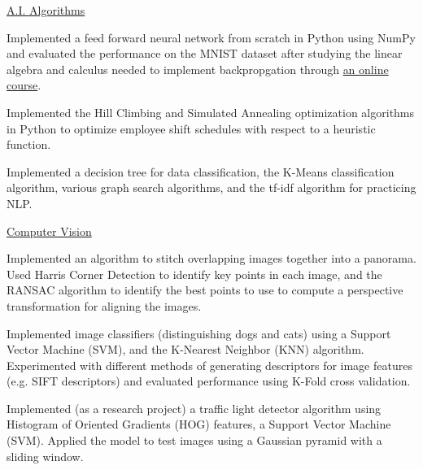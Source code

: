 
\begin{cventries}
  \cventry
    {} %
    {\href{https://github.com/dangbert/AI}{A.I. Algorithms}} %
    {} %
    {} %
    {
      \begin{cvitems} %
      \item {Implemented a feed forward neural network from scratch in Python using NumPy and evaluated the performance on the MNIST dataset after studying the linear algebra and calculus needed to implement backpropgation through \href{http://neuralnetworksanddeeplearning.com/}{an online course}.}
      \item {Implemented the Hill Climbing and Simulated Annealing optimization algorithms in Python 
to optimize employee shift schedules with respect to a heuristic function.}
      \item {Implemented a decision tree for data classification, the K-Means classification algorithm, various graph search algorithms, and the tf-idf algorithm for practicing NLP.}
      \end{cvitems}
    }

  \cventry
    {} %
    {\href{https://github.com/dangbert/college/tree/master/cmsc491-vision}{Computer Vision}} %
    {} %
    {} %
    {
      \begin{cvitems} %
        \item {Implemented an algorithm to stitch overlapping images together into a panorama.  Used Harris Corner Detection to identify key points in each image, and the RANSAC algorithm to identify the best points to use to compute a perspective transformation for aligning the images.}
        \item {Implemented image classifiers (distinguishing dogs and cats) using a Support Vector Machine (SVM), and the K-Nearest Neighbor (KNN) algorithm.  Experimented with different methods of generating descriptors for image features (e.g. SIFT descriptors) and evaluated performance using K-Fold cross validation.}
        \item {Implemented (as a research project) a traffic light detector algorithm using Histogram of Oriented Gradients (HOG) features, a Support Vector Machine (SVM).  Applied the model to test images using a Gaussian pyramid with a sliding window.}
      \end{cvitems}
    }


\end{cventries}
